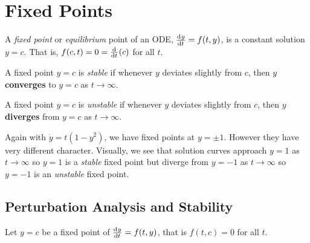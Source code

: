 \documentclass[../main.tex]{subfiles}
\begin{document}
\section{Fixed Points}
\begin{definition}
  A \textit{fixed point} or \textit{equilibrium} point of an ODE, $\deriv{y}{t} = f(t, y)$, is a constant solution $y = c$.
  That is, $f(c, t) = 0 = \deriv{}{t}(c)$ for all $t$.
\end{definition}
\begin{definition}
  A fixed point $y = c$ is \textit{stable} if whenever $y$ deviates slightly from $c$, then $y$ \textbf{converges} to $y = c$ as $t \to \infty$.
\end{definition}
\begin{definition}
  A fixed point $y = c$ is \textit{unstable} if whenever $y$ deviates slightly from $c$, then $y$ \textbf{diverges} from $y = c$ as $t \to \infty$.
\end{definition}
\begin{example}
  Again with $\dot{y} = t(1-y^2)$, we have fixed points at $y = \pm 1$.
  However they have very different character.
  Visually, we see that solution curves approach $y = 1$ as $t \to \infty$ so $y = 1$ is a \textit{stable} fixed point but diverge from $y = -1$ as $t \to \infty$ so $y = - 1$ is an \textit{unstable} fixed point.
\end{example}
\subsection{Perturbation Analysis and Stability}
\label{pertubationSec}
Let $y = c$ be a fixed point of $\deriv{y}{t} = f(t, y)$, that is $f(t, c) = 0$ for all $t$.
\end{document}
